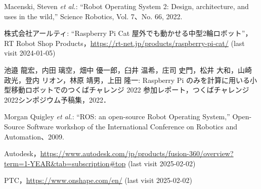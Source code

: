 \documentclass[twocolumn,9pt]{jsproceedings}
\begin{document}
\footnotesize
\begin{thebibliography}{99}

  Macenski, Steven {\it et al.}: ``Robot Operating System 2: Design, architecture, and uses in the wild,''
  Science Robotics, Vol. 7、No. 66, 2022.




  株式会社アールティ: ``Raspberry Pi Cat 屋外でも動かせる中型2輪ロボット''，
  RT Robot Shop Products，\url{https://rt-net.jp/products/raspberry-pi-cat/} (last visit 2024-01-05)

  池邉 龍宏，内田 璃空，畑中 優一郎，臼井 温希，庄司 史門，松井 大和，山崎 政光，登内 リオン，林原 靖男，上田 隆一: Raspberry Pi のみを計算に用いる小型移動ロボットでのつくばチャレンジ 2022 参加レポート，つくばチャレンジ2022シンポジウム予稿集，2022．

  Morgan Quigley {\it et al.}: ``ROS: an open-source Robot Operating System,''
  Open-Source Software workshop of the International Conference on Robotics and Automation、2009.

  Autodesk，\url{https://www.autodesk.com/jp/products/fusion-360/overview?term=1-YEAR&tab=subscription#top} (last visit 2025-02-02)

  PTC，\url{https://www.onshape.com/en/} (last visit 2025-02-02)






\end{thebibliography}
\end{document}
